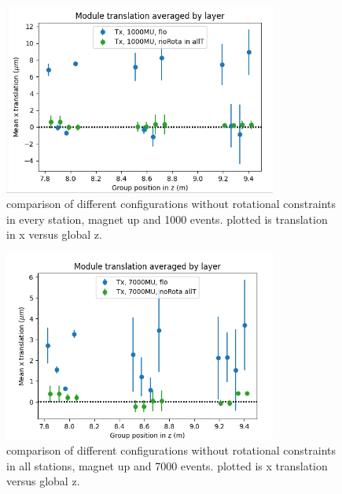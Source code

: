 \begin{figure}
  \centering
  \includegraphics[width=0.8\textwidth]{plots/june_21/Tx_noRota_allT_1000MU.png}
  \caption{comparison of different configurations without rotational constraints in every station, magnet up and 1000 events. plotted is translation in x versus global z.}
  \label{fig:june_2}
\end{figure}

\begin{figure}
  \centering
  \includegraphics[width=0.8\textwidth]{plots/june_21/Tx_noRota_allT_7000MU.png}
  \caption{comparison of different configurations without rotational constraints in all stations, magnet up and 7000 events. plotted is x translation versus global z.}
  \label{fig:june_2}
\end{figure}

